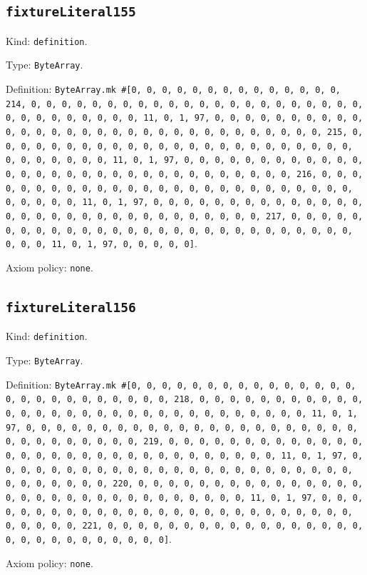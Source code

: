 \documentclass[11pt]{article}
\begin{document}
\subsection*{\texttt{fixtureLiteral155}}
\noindent Kind: \texttt{definition}.\par
\noindent Type: \texttt{ByteArray}.\par
\noindent Definition: \texttt{ByteArray.mk \#[0, 0, 0, 0, 0, 0, 0, 0, 0, 0, 0, 0, 0, 0, 214, 0, 0, 0, 0, 0, 0, 0, 0, 0, 0, 0, 0, 0, 0, 0, 0, 0, 0, 0, 0, 0, 0, 0, 0, 0, 0, 0, 0, 0, 0, 0, 11, 0, 1, 97, 0, 0, 0, 0, 0, 0, 0, 0, 0, 0, 0, 0, 0, 0, 0, 0, 0, 0, 0, 0, 0, 0, 0, 0, 0, 0, 0, 0, 0, 0, 0, 215, 0, 0, 0, 0, 0, 0, 0, 0, 0, 0, 0, 0, 0, 0, 0, 0, 0, 0, 0, 0, 0, 0, 0, 0, 0, 0, 0, 0, 0, 0, 0, 11, 0, 1, 97, 0, 0, 0, 0, 0, 0, 0, 0, 0, 0, 0, 0, 0, 0, 0, 0, 0, 0, 0, 0, 0, 0, 0, 0, 0, 0, 0, 0, 0, 0, 0, 216, 0, 0, 0, 0, 0, 0, 0, 0, 0, 0, 0, 0, 0, 0, 0, 0, 0, 0, 0, 0, 0, 0, 0, 0, 0, 0, 0, 0, 0, 0, 0, 11, 0, 1, 97, 0, 0, 0, 0, 0, 0, 0, 0, 0, 0, 0, 0, 0, 0, 0, 0, 0, 0, 0, 0, 0, 0, 0, 0, 0, 0, 0, 0, 0, 0, 0, 217, 0, 0, 0, 0, 0, 0, 0, 0, 0, 0, 0, 0, 0, 0, 0, 0, 0, 0, 0, 0, 0, 0, 0, 0, 0, 0, 0, 0, 0, 0, 0, 11, 0, 1, 97, 0, 0, 0, 0, 0]}.\par
\noindent Axiom policy: \texttt{none}.\par
\subsection*{\texttt{fixtureLiteral156}}
\noindent Kind: \texttt{definition}.\par
\noindent Type: \texttt{ByteArray}.\par
\noindent Definition: \texttt{ByteArray.mk \#[0, 0, 0, 0, 0, 0, 0, 0, 0, 0, 0, 0, 0, 0, 0, 0, 0, 0, 0, 0, 0, 0, 0, 0, 0, 0, 218, 0, 0, 0, 0, 0, 0, 0, 0, 0, 0, 0, 0, 0, 0, 0, 0, 0, 0, 0, 0, 0, 0, 0, 0, 0, 0, 0, 0, 0, 0, 0, 11, 0, 1, 97, 0, 0, 0, 0, 0, 0, 0, 0, 0, 0, 0, 0, 0, 0, 0, 0, 0, 0, 0, 0, 0, 0, 0, 0, 0, 0, 0, 0, 0, 0, 0, 219, 0, 0, 0, 0, 0, 0, 0, 0, 0, 0, 0, 0, 0, 0, 0, 0, 0, 0, 0, 0, 0, 0, 0, 0, 0, 0, 0, 0, 0, 0, 0, 11, 0, 1, 97, 0, 0, 0, 0, 0, 0, 0, 0, 0, 0, 0, 0, 0, 0, 0, 0, 0, 0, 0, 0, 0, 0, 0, 0, 0, 0, 0, 0, 0, 0, 0, 220, 0, 0, 0, 0, 0, 0, 0, 0, 0, 0, 0, 0, 0, 0, 0, 0, 0, 0, 0, 0, 0, 0, 0, 0, 0, 0, 0, 0, 0, 0, 0, 11, 0, 1, 97, 0, 0, 0, 0, 0, 0, 0, 0, 0, 0, 0, 0, 0, 0, 0, 0, 0, 0, 0, 0, 0, 0, 0, 0, 0, 0, 0, 0, 0, 0, 0, 221, 0, 0, 0, 0, 0, 0, 0, 0, 0, 0, 0, 0, 0, 0, 0, 0, 0, 0, 0, 0, 0, 0, 0, 0, 0, 0, 0, 0]}.\par
\noindent Axiom policy: \texttt{none}.\par
\end{document}
